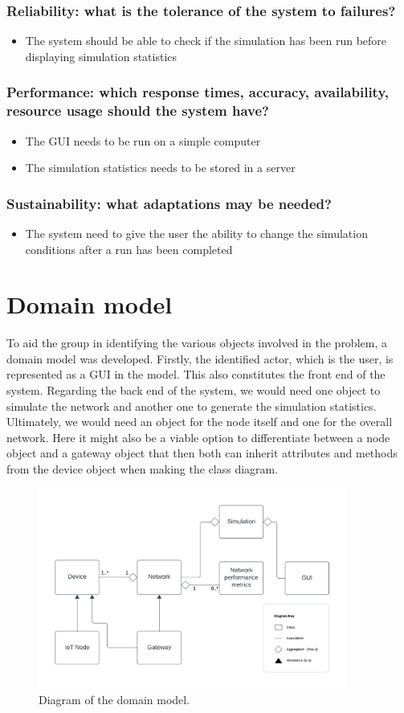 \subsubsection{Reliability: what is the tolerance of the system to failures?}
\begin{itemize}
  \item The system should be able to check if the simulation has been run before displaying simulation statistics
\end{itemize}

\subsubsection{Performance: which response times, accuracy, availability, resource usage should the system have?}

\begin{itemize}
    \item The GUI needs to be run on a simple computer
    \item The simulation statistics needs to be stored in a server
\end{itemize}

\subsubsection{Sustainability: what adaptations may be needed?}
\begin{itemize}
    \item The system need to give the user the ability to change the simulation conditions after a run has been completed
\end{itemize}

\section{Domain model}
To aid the group in identifying the various objects involved in the problem, a domain model was developed. Firstly, the identified actor, which is the user, is represented as a GUI in the model. This also constitutes the front end of the system. Regarding the back end of the system, we would need one object to simulate the network and another one to generate the simulation statistics. Ultimately, we would need an object for the node itself and one for the overall network. Here it might also be a viable option to differentiate between a node object and a gateway object that then both can inherit attributes and methods from the device object when making the class diagram.

\begin{figure}[H]
\centering
\includegraphics[width=0.9\textwidth]{Domain_model.pdf}
\caption{Diagram of the domain model.}
\label{fig:Domain_model}
\end{figure}


